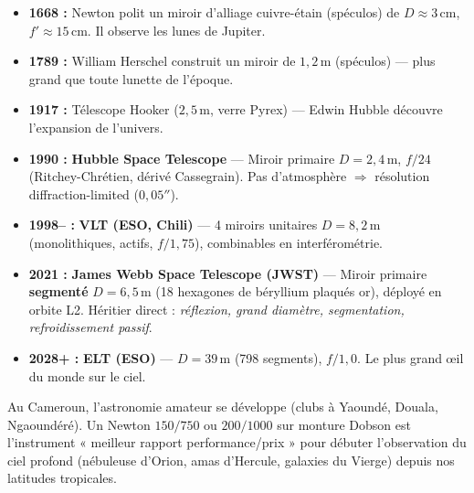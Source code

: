 \documentclass[11pt]{article}
\begin{document}
\begin{savaistu}
\begin{itemize}
    \item \textbf{1668 :} Newton polit un miroir d'alliage cuivre-étain (spéculos) de $D \approx 3\,\text{cm}$, $f' \approx 15\,\text{cm}$. Il observe les lunes de Jupiter.
    \item \textbf{1789 :} William Herschel construit un miroir de $1,2\,\text{m}$ (spéculos) — plus grand que toute lunette de l'époque.
    \item \textbf{1917 :} Télescope Hooker ($2,5\,\text{m}$, verre Pyrex) — Edwin Hubble découvre l'expansion de l'univers.
    \item \textbf{1990 :} \textbf{Hubble Space Telescope} — Miroir primaire $D = 2,4\,\text{m}$, $f/24$ (Ritchey-Chrétien, dérivé Cassegrain). Pas d'atmosphère $\Rightarrow$ résolution diffraction-limited ($0,05''$).
    \item \textbf{1998-- :} \textbf{VLT (ESO, Chili)} — 4 miroirs unitaires $D = 8,2\,\text{m}$ (monolithiques, actifs, $f/1,75$), combinables en interférométrie.
    \item \textbf{2021 :} \textbf{James Webb Space Telescope (JWST)} — Miroir primaire \textbf{segmenté} $D = 6,5\,\text{m}$ (18 hexagones de béryllium plaqués or), déployé en orbite L2. Héritier direct : \emph{réflexion, grand diamètre, segmentation, refroidissement passif}.
    \item \textbf{2028+ :} \textbf{ELT (ESO)} — $D = 39\,\text{m}$ (798 segments), $f/1,0$. Le plus grand œil du monde sur le ciel.
\end{itemize}
Au Cameroun, l'astronomie amateur se développe (clubs à Yaoundé, Douala, Ngaoundéré). Un Newton $150/750$ ou $200/1000$ sur monture Dobson est l'instrument « meilleur rapport performance/prix » pour débuter l'observation du ciel profond (nébuleuse d'Orion, amas d'Hercule, galaxies du Vierge) depuis nos latitudes tropicales.
\end{savaistu}
\end{document}
